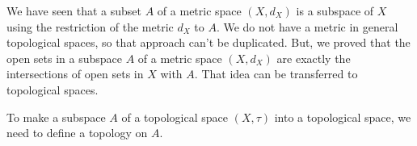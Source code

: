 \label{sec:subspaces}


\vspace*{-17 pt}

\vspace*{13 pt}


We have seen that a subset $A$ of a metric space $(X,d_X)$ is a subspace of $X$ using the restriction of the metric $d_X$ to $A$. We do not have a metric in general topological spaces, so that approach can't be duplicated. But, we proved that the open sets in a subspace $A$ of a metric space $(X,d_X)$ are exactly the intersections of open sets in $X$ with $A$. That idea can be transferred to topological spaces. 

To make a subspace $A$ of a topological space $(X,\tau)$ into a topological space, we need to define a topology on $A$.

